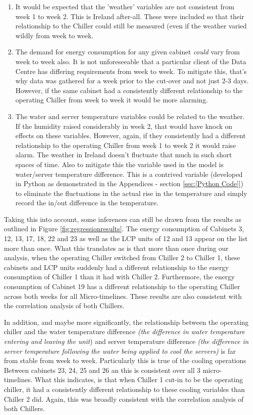 \documentclass[12pt]{scrartcl}
\begin{document}
\begin{enumerate}
\item It would be expected that the 'weather' variables are not consistent from week 1 to week 2. This is Ireland after-all. These were included so that their relationship to the Chiller could still be measured (even if the weather varied wildly from week to week. 
\item The demand for energy consumption for any given cabinet \textit{could} vary from week to week also. It is not unforeseeable that a particular client of the Data Centre has differing requirements from week to week. To mitigate this, that's why data was gathered for a week prior to the cut-over and not just 2-3 days. However, if the same cabinet had a consistently different relationship to the operating Chiller from week to week it would be more alarming.    
\item The water and server temperature variables could be related to the weather. If the humidity raised considerably in week 2, that would have knock on effects on these variables. However, again, if they consistently had a different relationship to the operating Chiller from week 1 to week 2 it would raise alarm. The weather in Ireland doesn't fluctuate that much in such short spaces of time. Also to mitigate this the variable used in the model is water/server temperature difference. This is a contrived variable (developed in Python as demonstrated in the Appendices - section \ref{sec:[Python Code]}) to eliminate the fluctuations in the actual rise in the temperature and simply record the in/out difference in the temperature.  
\end{enumerate} 

Taking this into account, some inferences can still be drawn from the results as outlined in Figure \ref{fig:regressionresults}. The energy consumption of Cabinets 3, 12, 13, 17, 18, 22 and 23 as well as the LCP units of 12 and 13 appear on the list more than once. What this translates as is that more than once during our analysis, when the operating Chiller switched from Chiller 2 to Chiller 1, these cabinets and LCP units suddenly had a different relationship to the energy consumption of Chiller 1 than it had with Chiller 2. Furthermore, the energy consumption of Cabinet 19 has a different relationship to the operating Chiller across both weeks for all Micro-timelines. These results are also consistent with the correlation analysis of both Chillers. 

In addition, and maybe more significantly, the relationship between the operating chiller and the water temperature difference \textit{(the difference in water temperature entering and leaving the unit}) and server temperature difference \textit{(the difference in server temperature following the water being applied to cool the servers)} is far from stable from week to week. Particularly this is true of the cooling operations Between cabinets 23, 24, 25 and 26 an this is consistent over all 3 micro-timelines. What this indicates, is that when Chiller 1 cut-in to be the operating chiller, it had a consistently different relationship to these cooling variables than Chiller 2 did. Again, this was broadly consistent with the correlation analysis of both Chillers.        
\end{document}
